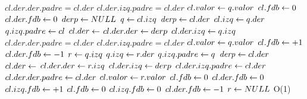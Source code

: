 {			\State $cl.der.der.padre = cl.der$
			\State $cl.der.izq.padre = cl.der$
			\State $cl.valor \leftarrow q.valor$
			\State $cl.fdb \leftarrow 0$
			\State $cl.der.fdb \leftarrow 0$
			\State $derp \leftarrow NULL$
		\Else
			\State $\text{\textit{q}} \leftarrow cl.izq$
			\State {} 
				\State $\text{\textit{derp}} \leftarrow cl.der$
				\State $cl.izq \leftarrow q.der$
				\State $q.izq.padre \leftarrow cl$
				\State $cl.der \leftarrow $
				\State $cl.der.der \leftarrow derp$
				\State $cl.der.izq \leftarrow q.izq$
				\State $cl.der.der.padre = cl.der$
				\State $cl.der.izq.padre = cl.der$
				\State $cl.valor \leftarrow q.valor$
				\State $cl.fdb \leftarrow +1$
				\State $cl.der.fdb \leftarrow -1$
			\Else
				\State {} 
					\State $\text{\textit{r}} \leftarrow q.izq$ 
					\State $q.izq \leftarrow r.der$
					\State $q.izq.padre \leftarrow q$
					\State $\text{\textit{derp}} \leftarrow cl.der$ 
					\State $cl.der \leftarrow $ 
					\State $cl.der.der \leftarrow r.izq$ 
					\State $cl.der.izq \leftarrow derp$ 
					\State $cl.der.izq.padre \leftarrow cl.der$ 
					\State $cl.der.der.padre \leftarrow cl.der$ 
					\State $cl.valor \leftarrow r.valor$ 
					\State {} 
						\State $cl.fdb \leftarrow 0$ 
						\State $cl.der.fdb \leftarrow 0$ 
						\State $cl.izq.fdb \leftarrow +1$ 
					\Else
						\State $cl.fdb \leftarrow 0$ 
						\State $cl.izq.fdb \leftarrow 0$ 
						\State $cl.der.fdb \leftarrow -1$ 
					\EndIf
					\State $r \leftarrow NULL$ 
				\EndIf
			\EndIf
		\EndIf
	\EndIf
}
{O(1)}
